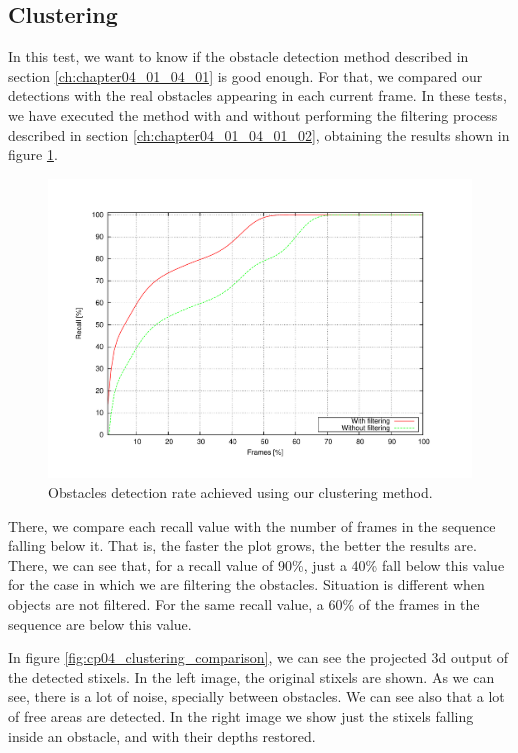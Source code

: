\subsection{Clustering}\label{ch:chapter04_02_01}

In this test, we want to know if the obstacle detection method described in section \ref{ch:chapter04_01_04_01} is good enough. For that, we compared our detections with the real obstacles appearing in each current frame. In these tests, we have executed the method with and without performing the filtering process described in section \ref{ch:chapter04_01_04_01_02}, obtaining the results shown in figure \ref{fig:cp04_detection_rate}.

\begin{figure}[h!]
\centering
\includegraphics[trim=50 40 80 60,clip]{detectionRate}
\caption{Obstacles detection rate achieved using our clustering method.}\label{fig:cp04_detection_rate}
\end{figure}

There, we compare each recall value with the number of frames in the sequence falling below it. That is, the faster the plot grows, the better the results are. There, we can see that, for a recall value of 90\%, just a 40\% fall below this value for the case in which we are filtering the obstacles. Situation is different when objects are not filtered. For the same recall value, a 60\% of the frames in the sequence are below this value.

In figure \ref{fig:cp04_clustering_comparison}, we can see the projected 3d output of the detected stixels. In the left image, the original stixels are shown. As we can see, there is a lot of noise, specially between obstacles. We can see also that a lot of free areas are detected. In the right image we show just the stixels falling inside an obstacle, and with their depths restored.

